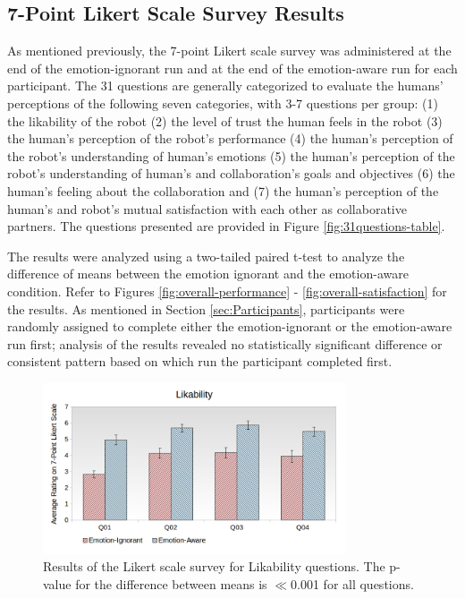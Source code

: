 \documentclass[12pt]{report}
\begin{document}
\subsection{7-Point Likert Scale Survey Results}
As mentioned previously, the 7-point Likert scale survey was administered at
the end of the emotion-ignorant run and at the end of the emotion-aware run for
each participant. The 31 questions are generally categorized to evaluate the
humans' perceptions of the following seven categories, with 3-7 questions per
group: (1) the likability of the robot (2) the level of trust the human feels
in the robot (3) the human's perception of the robot's performance (4) the
human's perception of the robot's understanding of human's emotions (5) the
human's perception of the robot's understanding of human's and collaboration's
goals and objectives (6) the human's feeling about the collaboration and (7)
the human's perception of the human's and robot's mutual satisfaction with each
other as collaborative partners. The questions presented are provided in Figure
\ref{fig:31questions-table}.

The results were analyzed using a two-tailed paired t-test to analyze the
difference of means between the emotion ignorant and the emotion-aware
condition. Refer to Figures \ref{fig:overall-performance} -
\ref{fig:overall-satisfaction} for the results. As mentioned in Section
\ref{sec:Participants}, participants were randomly assigned to complete either
the emotion-ignorant or the emotion-aware run first; analysis of the results
revealed no statistically significant difference or consistent pattern based on
which run the participant completed first.

\vspace*{-5mm}
\begin{figure}
 \centering
 \includegraphics[width=0.8\textwidth]{figure/Overall-Likability.png}
 \vspace*{-5mm}
 \caption{\fontsize{10}{10}\selectfont Results of the Likert scale survey for
 Likability questions. The p-value for the difference between means is
 $\ll$0.001 for all questions.}
 \label{fig:overall-likability}
 \vspace*{-5mm}
\end{figure}
\end{document}
